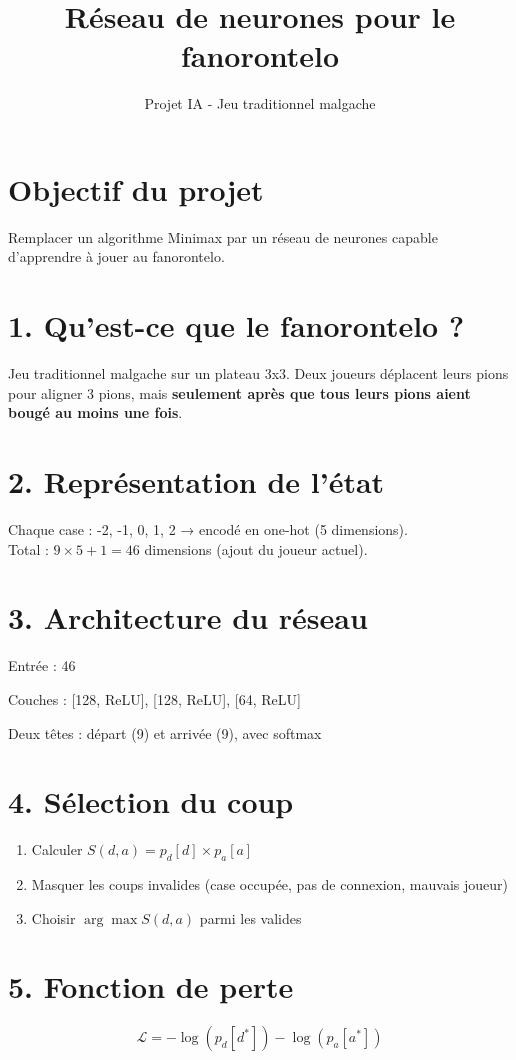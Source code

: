 \documentclass[12pt]{article}
\title{Réseau de neurones pour le fanorontelo}
\author{Projet IA - Jeu traditionnel malgache}
\date{}
\begin{document}
\maketitle

\section*{Objectif du projet}
Remplacer un algorithme Minimax par un réseau de neurones capable d'apprendre à jouer au fanorontelo.

\section*{1. Qu'est-ce que le fanorontelo ?}
Jeu traditionnel malgache sur un plateau 3x3. Deux joueurs déplacent leurs pions pour aligner 3 pions, mais \textbf{seulement après que tous leurs pions aient bougé au moins une fois}.

\section*{2. Représentation de l'état}
Chaque case : -2, -1, 0, 1, 2 → encodé en one-hot (5 dimensions). \\
Total : $9 \times 5 + 1 = 46$ dimensions (ajout du joueur actuel).

\section*{3. Architecture du réseau}
\item Entrée : 46
  \item Couches : [128, ReLU], [128, ReLU], [64, ReLU]
  \item Deux têtes : départ (9) et arrivée (9), avec softmax

\section*{4. Sélection du coup}
\begin{enumerate}
  \item Calculer $S(d,a) = p_d[d] \times p_a[a]$
  \item Masquer les coups invalides (case occupée, pas de connexion, mauvais joueur)
  \item Choisir $\arg\max S(d,a)$ parmi les valides
\end{enumerate}

\section*{5. Fonction de perte}
\[
\mathcal{L} = -\log(p_d[d^*]) - \log(p_a[a^*])
\]
\end{document}
